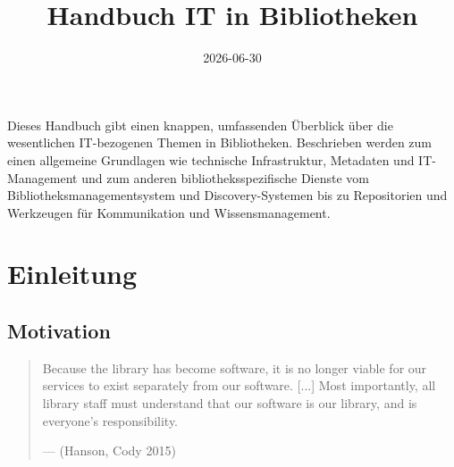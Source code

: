 \documentclass[
  11pt,
  letterpaper,
  DIV=11,
  twoside]{scrreprt}
\title{Handbuch IT in Bibliotheken}
\author{}
\date{2026-06-30}
\renewcommand{\maketitle}{}           %
\renewenvironment{abstract}{\begin{hidden}}{\end{hidden}}
\renewcommand*\contentsname{Inhaltsverzeichnis}
\newcommand\contentsname{Inhaltsverzeichnis}
\begin{document}
\maketitle
\begin{abstract}
Dieses Handbuch gibt einen knappen, umfassenden Überblick über die
wesentlichen IT-bezogenen Themen in Bibliotheken. Beschrieben werden zum
einen allgemeine Grundlagen wie technische Infrastruktur, Metadaten und
IT-Management und zum anderen bibliotheksspezifische Dienste vom
Bibliotheksmanagementsystem und Discovery-Systemen bis zu Repositorien
und Werkzeugen für Kommunikation und Wissensmanagement.
\end{abstract}


\renewcommand*\contentsname{Inhaltsverzeichnis}
{
\setcounter{tocdepth}{2}
\tableofcontents
}

\chapter{Einleitung}\label{einleitung}

\section{Motivation}\label{motivation}

\begin{quote}
Because the library has become software, it is no longer viable for our
services to exist separately from our software. {[}...{]} Most
importantly, all library staff must understand that our software is our
library, and is everyone's responsibility.

--- (Hanson, Cody 2015)
\end{quote}
\end{document}
